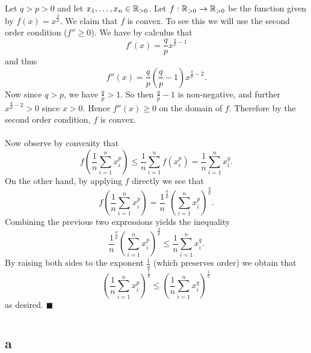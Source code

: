 \documentclass[letterpaper,12pt,oneside,onecolumn]{article}
\begin{document}
\section{}
\paragraph{}
Let $q > p > 0$ and let $x_1, \dots, x_n \in \mathbb{R}_{>0}$. Let $f : \mathbb{R}_{>0} \rightarrow \mathbb{R}_{>0}$ be the function given by $f(x) = x^\frac{q}{p}$. We claim that $f$ is convex. To see this we will use the second order condition ($f'' \geq 0$). We have by calculus that
$$f' (x)= \frac{q}{p} x^{\frac{q}{p}-1}$$
and thus 
$$f''(x) = \frac{q}{p}(\frac{q}{p} -1) x^{\frac{q}{p} - 2}.$$
Now since $q > p$, we have $\frac{q}{p} > 1$. So then $\frac{q}{p} - 1$ is non-negative, and further $x^{\frac{q}{p} - 2} > 0$ since $x >0$. Hence $f''(x) \geq 0$ on the domain of $f$. Therefore by the second order condition, $f$ is convex.
\paragraph{}
Now observe by convexity that
$$f(\frac{1}{n}\sum_{i=1}^n x_i^p) \leq \frac{1}{n} \sum_{i=1}^n f(x_i^p) = \frac{1}{n} \sum_{i=1}^n x_i^q.$$
On the other hand, by applying $f$ directly we see that
$$f(\frac{1}{n}\sum_{i=1}^n x_i^p) = \frac{1}{n}^\frac{q}{p}(\sum_{i=1}^n x_i^p)^\frac{q}{p}.$$
Combining the previous two expressions yields the inequality
$$\frac{1}{n}^\frac{q}{p}(\sum_{i=1}^n x_i^p)^\frac{q}{p} \leq \frac{1}{n} \sum_{i=1}^n x_i^q.$$
By raising both sides to the exponent $\frac{1}{q}$ (which preserves order) we obtain that
$$(\frac{1}{n}\sum_{i=1}^n x_i^p)^\frac{1}{p} \leq (\frac{1}{n} \sum_{i=1}^n x_i^q)^\frac{1}{q}$$
as desired. $\blacksquare$
\section{}
\subsection{a}
\end{document}
